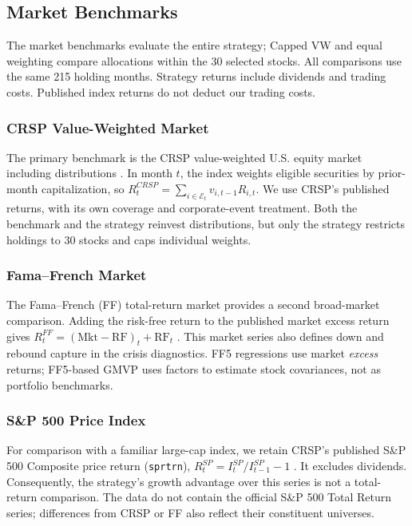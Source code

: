 \documentclass[letterpaper,journal]{IEEEtran}
\begin{document}
\subsection{Market Benchmarks}
The market benchmarks evaluate the entire strategy; Capped VW and equal weighting compare allocations within the 30 selected stocks. All comparisons use the same 215 holding months. Strategy returns include dividends and trading costs. Published index returns do not deduct our trading costs.

\subsubsection{CRSP Value-Weighted Market}\label{alloc:CRSP_market}
The primary benchmark is the CRSP value-weighted U.S. equity market including distributions \cite{crspindices}. In month $t$, the index weights eligible securities by prior-month capitalization, so $R_t^{CRSP}=\sum_{i\in\mathcal E_t}v_{i,t-1}R_{i,t}$. We use CRSP's published returns, with its own coverage and corporate-event treatment. Both the benchmark and the strategy reinvest distributions, but only the strategy restricts holdings to 30 stocks and caps individual weights.

\subsubsection{Fama--French Market}\label{alloc:FF_market}
The Fama--French (FF) total-return market provides a second broad-market comparison. Adding the risk-free return to the published market excess return gives $R_t^{FF}=(\mathrm{Mkt}-\mathrm{RF})_t+\mathrm{RF}_t$ \cite{ff5}. This market series also defines down and rebound capture in the crisis diagnostics. FF5 regressions use market \emph{excess} returns; FF5-based GMVP uses factors to estimate stock covariances, not as portfolio benchmarks.

\subsubsection{S\&P 500 Price Index}\label{alloc:SP500}
For comparison with a familiar large-cap index, we retain CRSP's published S\&P 500 Composite price return (\texttt{sprtrn}), $R_t^{SP}=I_t^{SP}/I_{t-1}^{SP}-1$ \cite{crspindices}. It excludes dividends. Consequently, the strategy's growth advantage over this series is not a total-return comparison. The data do not contain the official S\&P 500 Total Return series; differences from CRSP or FF also reflect their constituent universes.
\end{document}
